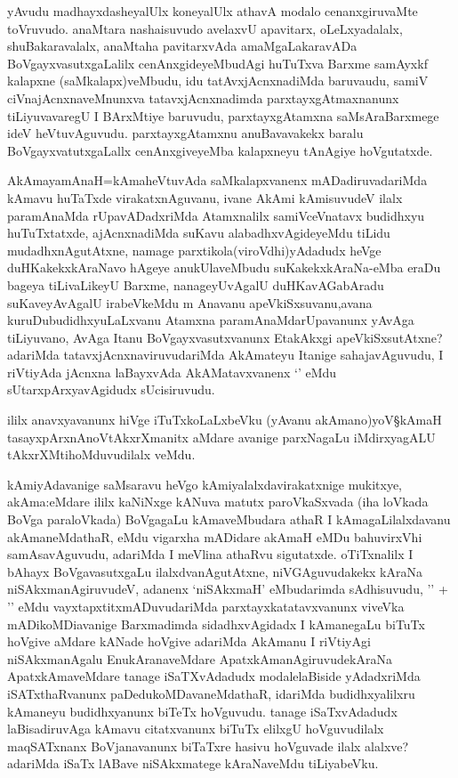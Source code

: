 \begin{artha}
yAvudu madhayxdasheyalUlx koneyalUlx athavA modalo cenanxgiruvaMte toVruvudo. anaMtara nashaisuvudo avelaxvU apavitarx, oLeLxyadalalx, shuBakaravalalx, anaMtaha pavitarxvAda amaMgaLakaravADa BoVgayxvasutxgaLalilx cenAnxgideyeMbudAgi huTuTxva Barxme samAyxkf kalapxne (saMkalapx)veMbudu, idu tatAvxjAcnxnadiMda baruvaudu, samiV ciVnajAcnxnaveMnunxva tatavxjAcnxnadimda parxtayxgAtmaxnanunx tiLiyuvavaregU I BArxMtiye baruvudu, parxtayxgAtamxna saMsAraBarxmege ideV heVtuvAguvudu. parxtayxgAtamxnu anuBavavakekx baralu BoVgayxvatutxgaLallx cenAnxgiveyeMba kalapxneyu tAnAgiye hoVgutatxde.
\end{artha}

\begin{artha}
AkAmayamAnaH=kAmaheVtuvAda saMkalapxvanenx mADadiruvadariMda kAmavu huTaTxde virakatxnAguvanu, ivane AkAmi kAmisuvudeV ilalx paramAnaMda rUpavADadxriMda Atamxnalilx samiVceVnatavx budidhxyu huTuTxtatxde, ajAcnxnadiMda suKavu alabadhxvAgideyeMdu tiLidu mudadhxnAgutAtxne, namage parxtikola(viroVdhi)yAdadudx heVge duHKakekxkAraNavo hAgeye anukUlaveMbudu suKakekxkAraNa-eMba eraDu bageya tiLivaLikeyU Barxme, nanageyUvAgalU duHKavAGabAradu suKaveyAvAgalU irabeVkeMdu m Anavanu apeVkiSxsuvanu,avana kuruDubudidhxyuLaLxvanu Atamxna paramAnaMdarUpavanunx yAvAga tiLiyuvano, AvAga Itanu BoVgayxvasutxvanunx EtakAkxgi apeVkiSxsutAtxne? adariMda tatavxjAcnxnaviruvudariMda AkAmateyu Itanige sahajavAguvudu, I riVtiyAda jAcnxna laBayxvAda AkAMatavxvanenx `\stext' eMdu sUtarxpArxyavAgidudx sUcisiruvudu. 
\end{artha}

\begin{artha}
ililx anavxyavanunx hiVge iTuTxkoLaLxbeVku (yAvanu akAmano)yoV\S kAmaH tasayxpArxnAnoVtAkxrXmanitx aMdare avanige parxNagaLu iMdirxyagALU tAkxrXMtihoMduvudilalx veMdu.
\end{artha}

\begin{artha}
kAmiyAdavanige saMsaravu heVgo kAmiyalalxdavirakatxnige mukitxye, akAma:eMdare ililx kaNiNxge kANuva matutx paroVkaSxvada (iha loVkada BoVga paraloVkada) BoVgagaLu kAmaveMbudara athaR I kAmagaLilalxdavanu akAmaneMdathaR, \stext eMdu vigarxha mADidare akAmaH eMDu bahuvirxVhi samAsavAguvudu, adariMda I meVlina athaRvu sigutatxde. oTiTxnalilx I bAhayx BoVgavasutxgaLu ilalxdvanAgutAtxne, niVGAguvudakekx kAraNa niSAkxmanAgiruvudeV, adanenx `niSAkxmaH' eMbudarimda sAdhisuvudu, '\stext' + '\stext' eMdu vayxtapxtitxmADuvudariMda parxtayxkatatavxvanunx viveVka mADikoMDiavanige Barxmadimda sidadhxvAgidadx I kAmanegaLu biTuTx hoVgive aMdare kANade hoVgive adariMda AkAmanu I riVtiyAgi niSAkxmanAgalu EnukAranaveMdare ApatxkAmanAgiruvudekAraNa ApatxkAmaveMdare tanage iSaTXvAdadudx modalelaBiside yAdadxriMda iSATxthaRvanunx paDedukoMDavaneMdathaR, idariMda budidhxyalilxru kAmaneyu budidhxyanunx biTeTx hoVguvudu. tanage iSaTxvAdadudx laBisadiruvAga kAmavu citatxvanunx biTuTx elilxgU hoVguvudilalx maqSATxnanx BoVjanavanunx biTaTxre hasivu hoVguvade ilalx alalxve? adariMda iSaTx lABave niSAkxmatege kAraNaveMdu tiLiyabeVku.
\end{artha}


